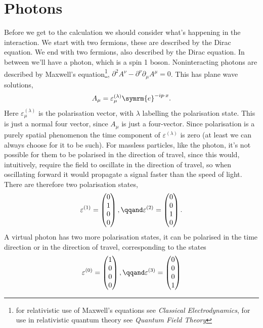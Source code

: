 \documentclass[fleqn]{NotesClass}
\newcommand{\course}[1]{\textit{#1}}
\newcommand{\e}{\symrm{e}}
\newcommand{\dalembertian}{\partial^2}
\begin{document}
    \section{Photons}
    Before we get to the calculation we should consider what's happening in the interaction.
    We start with two fermions, these are described by the Dirac equation.
    We end with two fermions, also described by the Dirac equation.
    In between we'll have a photon, which is a spin 1 boson.
    Noninteracting photons are described by Maxwell's equation\footnote{for relativistic use of Maxwell's equations see \course{Classical Electrodynamics}, for use in relativistic quantum theory see \course{Quantum Field Theory}}, \(\dalembertian A^\nu - \partial^\nu\partial_\mu A^\mu = 0\).
    This has plane wave solutions,
    \begin{equation}
        A_\mu = \varepsilon_\mu^{(\lambda)} \e^{-ip\cdot x}.
    \end{equation}
    Here \(\varepsilon_\mu^{(\lambda)}\) is the polarisation vector, with \(\lambda\) labelling the polarisation state.
    This is just a normal four vector, since \(A_\mu\) is just a four-vector.
    Since polarisation is a purely spatial phenomenon the time component of \(\varepsilon^{(\lambda)}\) is zero (at least we can always choose for it to be such).
    For massless particles, like the photon, it's not possible for them to be polarised in the direction of travel, since this would, intuitively, require the field to oscillate in the direction of travel, so when oscillating forward it would propagate a signal faster than the speed of light.
    There are therefore two polarisation states,
    \begin{equation}
        \varepsilon^{(1)} = 
        \begin{pmatrix}
            0\\ 1\\ 0\\ 0
        \end{pmatrix}
        , \qqand \varepsilon^{(2)} = 
        \begin{pmatrix}
            0\\ 0\\ 1\\ 0
        \end{pmatrix}
        .
    \end{equation}
    A virtual photon has two more polarisation states, it can be polarised in the time direction or in the direction of travel, corresponding to the states
    \begin{equation}
        \varepsilon^{(0)} = 
        \begin{pmatrix}
            1\\ 0\\ 0\\ 0
        \end{pmatrix}
        , \qqand \varepsilon^{(3)} = 
        \begin{pmatrix}
            0\\ 0\\ 0\\ 1
        \end{pmatrix}
    \end{equation}
\end{document}
